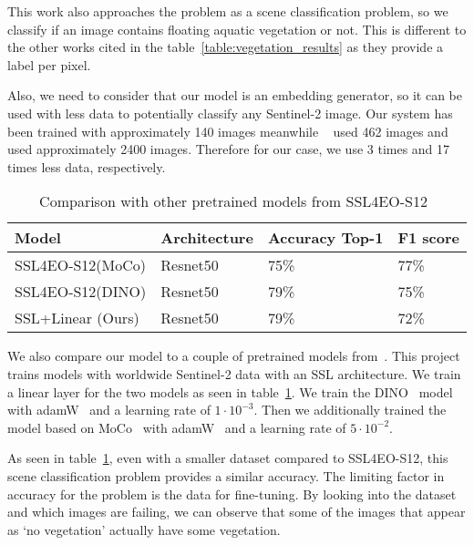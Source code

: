 \documentclass[conference]{IEEEtran}
\begin{document}
    This work also approaches the problem as a scene classification problem, so we classify if an image contains floating aquatic vegetation or not.
    This is different to the other works cited in the table~\ref{table:vegetation_results} as they provide a label per pixel.

    Also, we need to consider that our model is an embedding generator, so it can be used with less data to potentially classify any Sentinel-2 image.
    Our system has been trained with approximately 140 images meanwhile ~\citet{rs12244021} used 462 images and~\citet{rs14133013} used approximately 2400 images.
    Therefore for our case, we use 3 times and 17 times less data, respectively.

    \begin{table}[h!]
        \centering
        \begin{tabular}{ |p{3cm}||p{1.3cm}|p{1.9cm}|p{1cm}|}
            \hline
            Model                                    & Architecture & Accuracy Top-1 & F1 score \\
            \hline
            \hline
            SSL4EO-S12(MoCo)\cite{wang2023ssl4eos12} & Resnet50     & 75\%           & 77\%     \\
            SSL4EO-S12(DINO)\cite{wang2023ssl4eos12} & Resnet50     & 79\%           & 75\%     \\
            SSL+Linear (Ours)                        & Resnet50     & 79\%           & 72\%     \\
            \hline
        \end{tabular}
        \caption{Comparison with other pretrained models from SSL4EO-S12~\cite{wang2023ssl4eos12}}
        \label{tab:vegetation_results_ssl}
    \end{table}

    We also compare our model to a couple of pretrained models from~\citet{wang2023ssl4eos12}.
    This project trains models with worldwide Sentinel-2 data with an SSL architecture.
    We train a linear layer for the two models as seen in table~\ref{tab:vegetation_results_ssl}.
    We train the DINO~\cite{DINO} model with adamW~\cite{loshchilov2019decoupled} and a learning rate of $1\cdot10^{-3}$.
    Then we additionally trained the model based on MoCo~\cite{chen2020mocov2} with adamW~\cite{loshchilov2019decoupled} and a learning rate of $5\cdot10^{-2}$.

    As seen in table~\ref{tab:vegetation_results_ssl}, even with a smaller dataset compared to SSL4EO-S12, this scene classification problem provides a
    similar accuracy.
    The limiting factor in accuracy for the problem is the data for fine-tuning.
    By looking into the dataset and which images are failing, we can observe that some of the images that appear as `no vegetation' actually have some
    vegetation.
\end{document}
